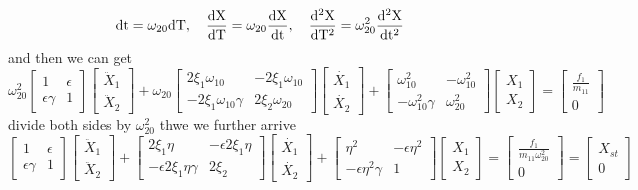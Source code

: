 \documentclass{article}
\begin{document}
	$$ 
	\rm{d}t = \omega_{20} \rm{d}T, \quad \frac{\rm{d} X}{\rm{d}T}= \omega_{20} \frac{\rm{d}X}{\rm{d} t}, \quad \frac{\rm{d}^2 X}{\rm{d} T^2}=\omega_{20}^2 \frac{\rm{d}^2 X}{\rm{d} t^2}
	$$
	and then we can get 
	\begin{equation}
	\omega_{20}^2 \begin{bmatrix}
	1 & \epsilon \\ \epsilon \gamma & 1
	\end{bmatrix} \begin{bmatrix}
	\ddot{X}_1\\ \ddot{X}_2
	\end{bmatrix}
	+ \omega_{20} \begin{bmatrix} 2 \xi_1 \omega_{10} & - 2 \xi_1 \omega_{10} \\ - 2 \xi_1 \omega_{10} \gamma & 2 \xi_2 \omega_{20}
	\end{bmatrix} \begin{bmatrix}
	\dot{X_1}\\ \dot{X_2}
	\end{bmatrix}+\begin{bmatrix} \omega_{10}^2 & - \omega_{10}^2 \\  - \omega_{10}^2 \gamma &  \omega_{20}^2
	\end{bmatrix} \begin{bmatrix}
	X_1\\ X_2
	\end{bmatrix}=\begin{bmatrix}
	\frac{f_1}{m_{11}}\\0
	\end{bmatrix}
	\end{equation}
	divide both sides by $\omega_{20}^2$ thwe we further arrive 
	\begin{equation}
	 \begin{bmatrix}
	1 & \epsilon \\ \epsilon \gamma & 1
	\end{bmatrix} \begin{bmatrix}
	\ddot{X}_1\\ \ddot{X}_2
	\end{bmatrix}
	+  \begin{bmatrix} 2 \xi_1 \eta & -\epsilon 2 \xi_1 \eta \\ -\epsilon 2 \xi_1 \eta \gamma & 2 \xi_2 
	\end{bmatrix} \begin{bmatrix}
	\dot{X_1}\\ \dot{X_2}
	\end{bmatrix}+\begin{bmatrix} \eta^2 & -\epsilon \eta^2 \\  -\epsilon \eta^2 \gamma &  1
	\end{bmatrix} \begin{bmatrix}
	X_1\\ X_2
	\end{bmatrix}=\begin{bmatrix}
	\frac{f_1}{m_{11} \omega_{20}^2}\\0
	\end{bmatrix}=\begin{bmatrix}
	X_{st}\\0
	\end{bmatrix}
	\end{equation}
\end{document}
